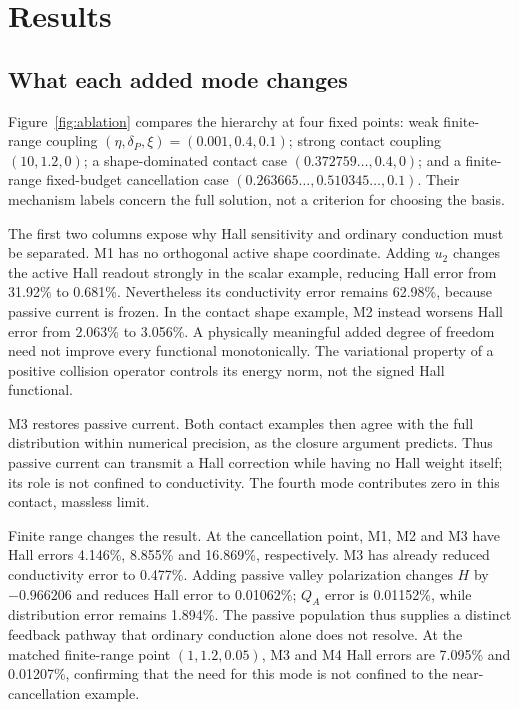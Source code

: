 \section{Results}
\subsection{What each added mode changes}
Figure~\ref{fig:ablation} compares the hierarchy at four fixed points: weak finite-range coupling $(\eta,\delta_P,\xi)=(0.001,0.4,0.1)$; strong contact coupling $(10,1.2,0)$; a shape-dominated contact case $(0.372759\ldots,0.4,0)$; and a finite-range fixed-budget cancellation case $(0.263665\ldots,0.510345\ldots,0.1)$. Their mechanism labels concern the full solution, not a criterion for choosing the basis.

The first two columns expose why Hall sensitivity and ordinary conduction must be separated. M1 has no orthogonal active shape coordinate. Adding $u_2$ changes the active Hall readout strongly in the scalar example, reducing Hall error from 31.92\% to 0.681\%. Nevertheless its conductivity error remains 62.98\%, because passive current is frozen. In the contact shape example, M2 instead worsens Hall error from 2.063\% to 3.056\%. A physically meaningful added degree of freedom need not improve every functional monotonically. The variational property of a positive collision operator controls its energy norm, not the signed Hall functional.

M3 restores passive current. Both contact examples then agree with the full distribution within numerical precision, as the closure argument predicts. Thus passive current can transmit a Hall correction while having no Hall weight itself; its role is not confined to conductivity. The fourth mode contributes zero in this contact, massless limit.

Finite range changes the result. At the cancellation point, M1, M2 and M3 have Hall errors 4.146\%, 8.855\% and 16.869\%, respectively. M3 has already reduced conductivity error to 0.477\%. Adding passive valley polarization changes $H$ by $-0.966206$ and reduces Hall error to 0.01062\%; $Q_A$ error is 0.01152\%, while distribution error remains 1.894\%. The passive population thus supplies a distinct feedback pathway that ordinary conduction alone does not resolve. At the matched finite-range point $(1,1.2,0.05)$, M3 and M4 Hall errors are 7.095\% and 0.01207\%, confirming that the need for this mode is not confined to the near-cancellation example.

